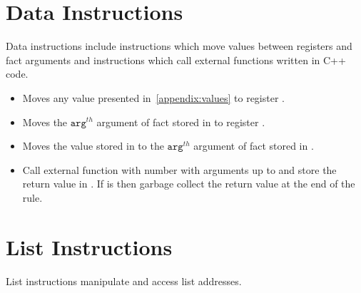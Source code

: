 \section{Data Instructions}

Data instructions include instructions which move values between registers and fact arguments and
instructions which call external functions written in C++ code.

\begin{itemize}
   \item {}

      Moves any value presented in~\ref{appendix:values} to register .

   \item {}

      Moves the $\mathtt{arg}^{th}$ argument of fact stored in  to
      register .

   \item {}

      Moves the value stored in  to the $\mathtt{arg}^{th}$ argument of
      fact stored in .

   \item {}

      Call external function with number  with  arguments
       up to  and store the return value in .
      If  is  then garbage collect the return value at the
      end of the rule.

\end{itemize}

\section{List Instructions}

List instructions manipulate and access list addresses.

